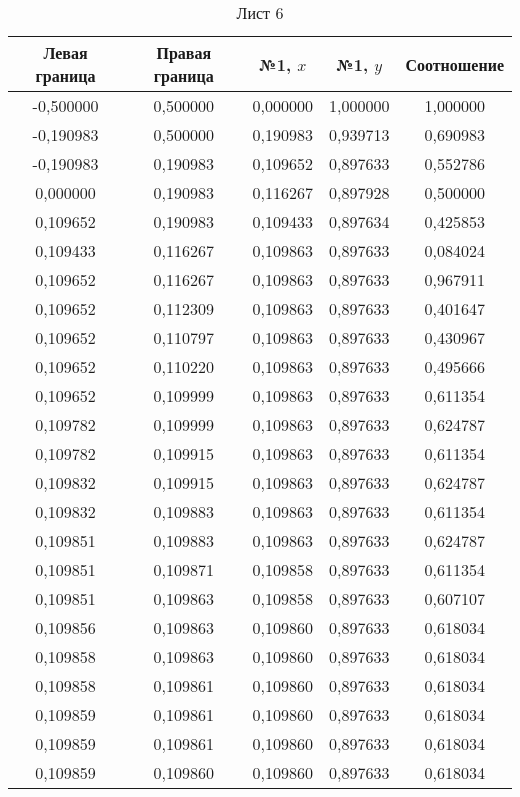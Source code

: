 

\begin{table}
\center
\begin{tabular}{ccccc}
\toprule
Левая граница & Правая граница 
& №1, $x$ & №1, $y$ 
  & Соотношение \\
\midrule
-0,500000 & 0,500000 & 0,000000 & 1,000000 & 1,000000 \\
-0,190983 & 0,500000 & 0,190983 & 0,939713 & 0,690983 \\
-0,190983 & 0,190983 & 0,109652 & 0,897633 & 0,552786 \\
0,000000  & 0,190983 & 0,116267 & 0,897928 & 0,500000 \\
0,109652  & 0,190983 & 0,109433 & 0,897634 & 0,425853 \\
0,109433  & 0,116267 & 0,109863 & 0,897633 & 0,084024 \\
0,109652  & 0,116267 & 0,109863 & 0,897633 & 0,967911 \\
0,109652  & 0,112309 & 0,109863 & 0,897633 & 0,401647 \\
0,109652  & 0,110797 & 0,109863 & 0,897633 & 0,430967 \\
0,109652  & 0,110220 & 0,109863 & 0,897633 & 0,495666 \\
0,109652  & 0,109999 & 0,109863 & 0,897633 & 0,611354 \\
0,109782  & 0,109999 & 0,109863 & 0,897633 & 0,624787 \\
0,109782  & 0,109915 & 0,109863 & 0,897633 & 0,611354 \\
0,109832  & 0,109915 & 0,109863 & 0,897633 & 0,624787 \\
0,109832  & 0,109883 & 0,109863 & 0,897633 & 0,611354 \\
0,109851  & 0,109883 & 0,109863 & 0,897633 & 0,624787 \\
0,109851  & 0,109871 & 0,109858 & 0,897633 & 0,611354 \\
0,109851  & 0,109863 & 0,109858 & 0,897633 & 0,607107 \\
0,109856  & 0,109863 & 0,109860 & 0,897633 & 0,618034 \\
0,109858  & 0,109863 & 0,109860 & 0,897633 & 0,618034 \\
0,109858  & 0,109861 & 0,109860 & 0,897633 & 0,618034 \\
0,109859  & 0,109861 & 0,109860 & 0,897633 & 0,618034 \\
0,109859  & 0,109861 & 0,109860 & 0,897633 & 0,618034 \\
0,109859  & 0,109860 & 0,109860 & 0,897633 & 0,618034 \\
\bottomrule
\end{tabular}
\caption{Лист 6}
\end{table}

